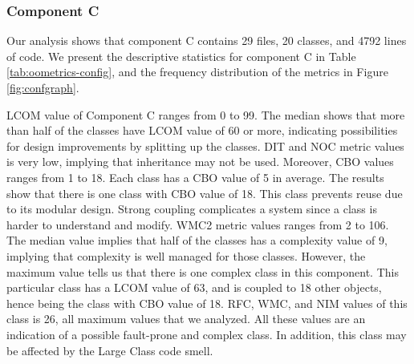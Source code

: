 \subsubsection{Component C}
Our analysis shows that component C contains 29 files, 20 classes, and 4792 lines of code. We present the descriptive statistics for component C in Table \ref{tab:oometrics-config}, and the frequency distribution of the metrics in Figure \ref{fig:confgraph}.

LCOM value of Component C ranges from 0 to 99. The median shows that more than half of the classes have LCOM value of 60 or more, indicating possibilities for design improvements by splitting up the classes. DIT and NOC metric values is very low, implying that inheritance may not be used. Moreover, CBO values ranges from 1 to 18. Each class has a CBO value of 5 in average. The results show that there is one class with CBO value of 18. This class prevents reuse due to its modular design. Strong coupling complicates a system since a class is harder to understand and modify. WMC2 metric values ranges from 2 to 106. The median value implies that half of the classes has a complexity value of 9, implying that complexity is well managed for those classes. However, the maximum value tells us that there is one complex class in this component. This particular class has a LCOM value of 63, and is coupled to 18 other objects, hence being the class with CBO value of 18. RFC, WMC, and NIM values of this class is 26, all maximum values that we analyzed. All these values are an indication of a possible fault-prone and complex class. In addition, this class may be affected by the Large Class code smell.




